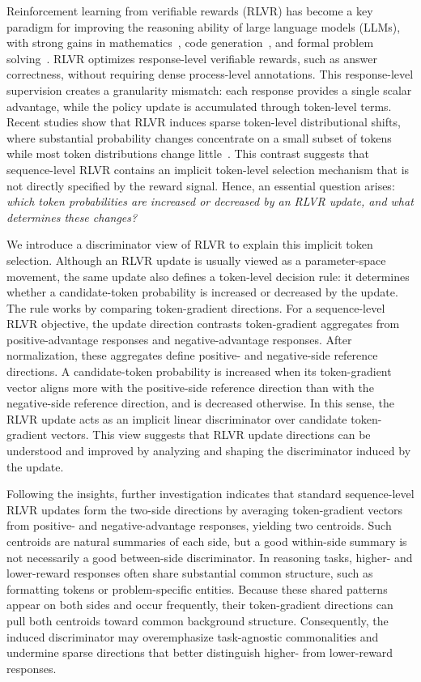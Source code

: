 \documentclass{article} %
\begin{document}
Reinforcement learning from verifiable rewards (RLVR) has become a key paradigm for improving the reasoning ability of large language models (LLMs), with strong gains in mathematics~\citep{shao2024deepseekmath,yang2024qwen2}, code generation~\citep{hui2024qwen2,shojaee2023execution,le2022coderl}, and formal problem solving~\citep{guo2025deepseek,team2025kimi}. 
RLVR optimizes response-level verifiable rewards, such as answer correctness, without requiring dense process-level annotations. 
This response-level supervision creates a granularity mismatch: each response provides a single scalar advantage, while the policy update is accumulated through token-level  terms. 
Recent studies show that RLVR induces sparse token-level distributional shifts, where substantial probability changes concentrate on a small subset of tokens while most token distributions change little~\citep{meng2026sparse,ma2026fipo}. 
This contrast suggests that sequence-level RLVR contains an implicit token-level selection mechanism that is not directly specified by the reward signal. 
Hence, an essential question arises: \textit{which token probabilities are increased or decreased by an RLVR update, and what determines these changes?}

We introduce a discriminator view of RLVR to explain this implicit token selection. 
Although an RLVR update is usually viewed as a parameter-space movement, the same update also defines a token-level decision rule: it determines whether a candidate-token probability is increased or decreased by the update.
The rule works by comparing token-gradient directions. 
For a sequence-level RLVR objective, the update direction contrasts token-gradient aggregates from positive-advantage responses and negative-advantage responses. 
After normalization, these aggregates define positive- and negative-side reference directions. 
A candidate-token probability is increased when its token-gradient vector aligns more with the positive-side reference direction than with the negative-side reference direction, and is decreased otherwise. In this sense, the RLVR update acts as an implicit linear discriminator over candidate token-gradient vectors. This view suggests that RLVR update directions can be understood and improved by analyzing and shaping the discriminator induced by the update.


Following the insights, further investigation indicates that standard sequence-level RLVR updates form the two-side directions by averaging token-gradient vectors from positive- and negative-advantage responses, yielding two centroids. 
Such centroids are natural summaries of each side, but a good within-side summary is not necessarily a good between-side discriminator. 
In reasoning tasks, higher- and lower-reward responses often share substantial common structure, such as formatting tokens or problem-specific entities. 
Because these shared patterns appear on both sides and occur frequently, their token-gradient directions can pull both centroids toward common background structure. 
Consequently, the induced discriminator may overemphasize task-agnostic commonalities and undermine sparse directions that better distinguish higher- from lower-reward responses.
\end{document}
